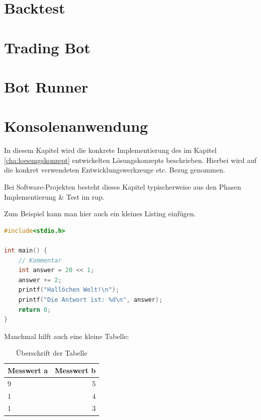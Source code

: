 \documentclass[oneside]{ausarbeitung}
\begin{document}

\section{Backtest}
\label{sec:entwurf_einer_konsolenanwendung}


\section{Trading Bot}
\label{sec:entwurf_einer_konsolenanwendung}


\section{Bot Runner}
\label{sec:entwurf_einer_konsolenanwendung}


\section{Konsolenanwendung}
\label{sec:entwurf_einer_konsolenanwendung}


In diesem Kapitel wird die konkrete Implementierung des im Kapitel
\ref{cha:loesungskonzept} entwickelten Lösungskonzepts beschrieben.
Hierbei wird auf die konkret verwendeten Entwicklungswerkzeuge etc. 
Bezug genommen.

Bei Software-Projekten besteht dieses Kapitel typischerweise aus den 
Phasen Implementierung \& Test im \ac{rup}.

Zum Beispiel kann man hier auch ein kleines Listing einfügen.

\begin{lstlisting}[language=c,%
                   caption={Überschrift des Quelltexts}]
#include<stdio.h>

int main() {
    // Kommentar
    int answer = 20 << 1;
    answer += 2;
    printf("Hallöchen Welt!\n");
    printf("Die Antwort ist: %d\n", answer);
    return 0;
}
\end{lstlisting}

Manchmal hilft auch eine kleine Tabelle:

\begin{table}[htbp]
\centering
\begin{tabular}{|l|r|}
\hline
\textbf{Messwert a} & \textbf{Messwert b} \\ \hline
9 & 5 \\ \hline
1 & 4 \\ \hline
1 & 3 \\ \hline
\end{tabular}
\caption{Überschrift der Tabelle}
\label{tab:my-table}
\end{table}
\end{document}
